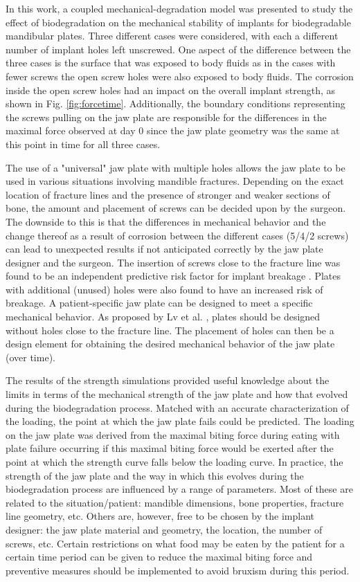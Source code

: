 In this work, a coupled mechanical-degradation model was presented to study the effect of biodegradation on the mechanical stability of implants for biodegradable mandibular plates. Three different cases were considered, with each a different number of implant holes left unscrewed. One aspect of the difference between the three cases is the surface that was exposed to body fluids as in the cases with fewer screws the open screw holes were also exposed to body fluids. The corrosion inside the open screw holes had an impact on the overall implant strength, as shown in Fig. \ref{fig:forcetime}. Additionally, the boundary conditions representing the screws pulling on the jaw plate are responsible for the differences in the maximal force observed at day 0 since the jaw plate geometry was the same at this point in time for all three cases.

The use of a "universal" jaw plate with multiple holes allows the jaw plate to be used in various situations involving mandible fractures. Depending on the exact location of fracture lines and the presence of stronger and weaker sections of bone, the amount and placement of screws can be decided upon by the surgeon. The downside to this is that the differences in mechanical behavior and the change thereof as a result of corrosion between the different cases (5/4/2 screws) can lead to unexpected results if not anticipated correctly by the jaw plate designer and the surgeon. The insertion of screws close to the fracture line was found to be an independent predictive risk factor for implant breakage \cite{Lv2017}. Plates with additional (unused) holes were also found to have an increased risk of breakage. A patient-specific jaw plate can be designed to meet a specific mechanical behavior. As proposed by Lv et al. \cite{Lv2017}, plates should be designed without holes close to the fracture line. The placement of holes can then be a design element for obtaining the desired mechanical behavior of the jaw plate (over time).

The results of the strength simulations provided useful knowledge about the limits in terms of the mechanical strength of the jaw plate and how that evolved during the biodegradation process. Matched with an accurate characterization of the loading, the point at which the jaw plate fails could be predicted. The loading on the jaw plate was derived from the maximal biting force during eating with plate failure occurring if this maximal biting force would be exerted after the point at which the strength curve falls below the loading curve. In practice, the strength of the jaw plate and the way in which this evolves during the biodegradation process are influenced by a range of parameters. Most of these are related to the situation/patient: mandible dimensions, bone properties, fracture line geometry, etc. Others are, however, free to be chosen by the implant designer: the jaw plate material and geometry, the location, the number of screws, etc. Certain restrictions on what food may be eaten by the patient for a certain time period can be given to reduce the maximal biting force and preventive measures should be implemented to avoid bruxism during this period.

